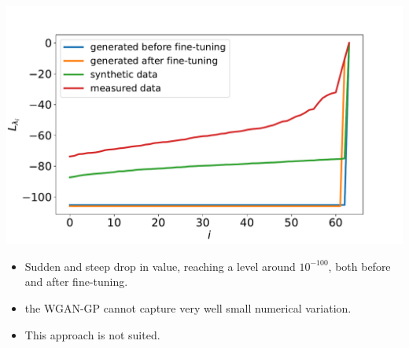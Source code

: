 \documentclass[12pt,pdftex,16x10]{elpres} %
\begin{document}
\begin{psli}
  \begin{minipage}[b][0.7\textheight][t]{0.5\textwidth}
    \centering
    \includegraphics[width=1.2\textwidth]{figs/samples_evals_wgangp.pdf}
  \end{minipage}
  \begin{minipage}[b][0.7\textheight][t]{0.5\textwidth}
    \begin{itemize}
        \item Sudden and steep drop in value, reaching a level around $10^{-100}$, both before and after fine-tuning.
        \item the WGAN-GP cannot capture very well small numerical variation.
        \item This approach is not suited.
    \end{itemize}
  \end{minipage}
\end{psli}
\end{document}
